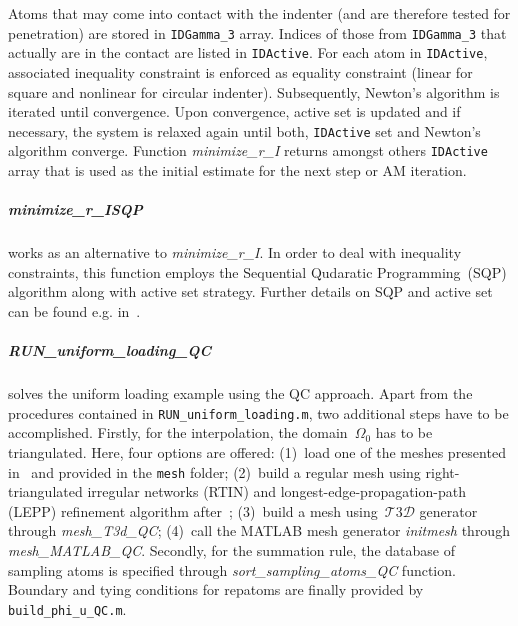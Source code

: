 \documentclass[preprint,12pt,authoryear]{elsarticle}
\begin{document}
Atoms that may come into contact with the indenter (and are therefore tested for penetration) are stored in \texttt{IDGamma\_3} array. Indices of those from \texttt{IDGamma\_3} that actually are in the contact are listed in \texttt{IDActive}. For each atom in \texttt{IDActive}, associated inequality constraint is enforced as equality constraint (linear for square and nonlinear for circular indenter). Subsequently, Newton's algorithm is iterated until convergence. Upon convergence, active set is updated and if necessary, the system is relaxed again until both, \texttt{IDActive} set and Newton's algorithm converge. Function \emph{minimize\_r\_I} returns amongst others \texttt{IDActive} array that is used as the initial estimate for the next step or AM iteration.
%
%
\subparagraph{minimize\_r\_ISQP} works as an alternative to \emph{minimize\_r\_I}. In order to deal with inequality constraints, this function employs the Sequential Qudaratic Programming~(SQP) algorithm along with active set strategy. Further details on SQP and active set can be found e.g. in~\cite{Fletcher:1987:PMO,BonnansOptim,Nocedal:2006:NumOpt}.
%
%
\subparagraph{RUN\_uniform\_loading\_QC} solves the uniform loading example using the QC approach. Apart from the procedures contained in \texttt{RUN\_uniform\_loading.m}, two additional steps have to be accomplished. Firstly, for the interpolation, the domain~$\Omega_0$ has to be triangulated. Here, four options are offered: (1)~load one of the meshes presented in~\cite[Fig.~5]{RokosQC} and provided in the \texttt{mesh} folder; (2)~build a regular mesh using right-triangulated irregular networks (RTIN) and longest-edge-propagation-path (LEPP) refinement algorithm after~\cite{Rivara:LEPP}; (3)~build a mesh using~\href{http://ksm.fsv.cvut.cz/~dr/t3d.html}{$\mathcal{T}3\mathcal{D}$} generator through \emph{mesh\_T3d\_QC}; (4)~call the MATLAB mesh generator \emph{initmesh} through \emph{mesh\_MATLAB\_QC}. Secondly, for the summation rule, the database of sampling atoms is specified through \emph{sort\_sampling\_atoms\_QC} function. Boundary and tying conditions for repatoms are finally provided by \texttt{build\_phi\_u\_QC.m}.
\end{document}

